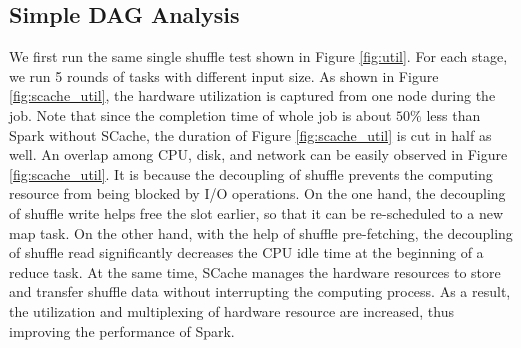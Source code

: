 \subsection{Simple DAG Analysis}\label{simpledag}
We first run the same single shuffle test shown in Figure \ref{fig:util}. 
For each stage, we run 5 rounds of tasks with different input size. 
As shown in Figure \ref{fig:scache_util}, the hardware utilization is captured from one node during the job. 
Note that since the completion time of whole job is about $50\%$ less than Spark without SCache, the duration of Figure \ref{fig:scache_util} is cut in half as well. 
An overlap among CPU, disk, and network can be easily observed in Figure \ref{fig:scache_util}. 
It is because the decoupling of shuffle prevents the computing resource from being blocked by I/O operations. 
On the one hand, the decoupling of shuffle write helps free the slot earlier, so that it can be re-scheduled to a new map task.
On the other hand, with the help of shuffle pre-fetching, the decoupling of shuffle read significantly decreases the CPU idle time at the beginning of a reduce task.
At the same time, SCache manages the hardware resources to store and transfer shuffle data without interrupting the computing process.
As a result, the utilization and multiplexing of hardware resource are increased, thus improving the performance of Spark. 


